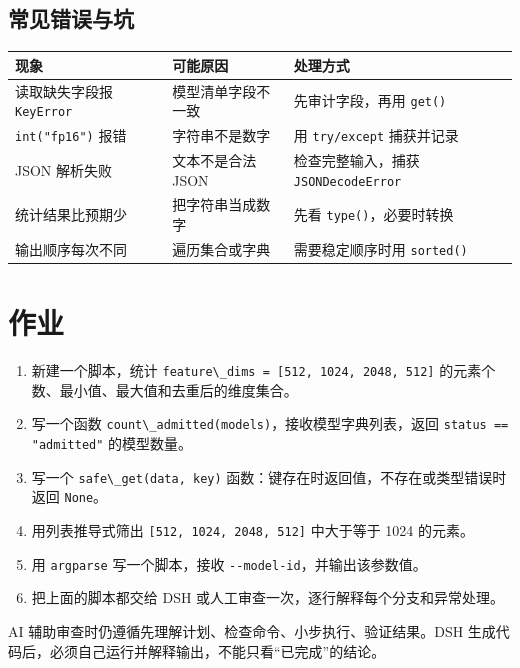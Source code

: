 \subsection{常见错误与坑}\label{src-appendix-appendix3-pitfalls}

\begin{longtable}[]{@{}
  >{\raggedright\arraybackslash}p{}
  >{\raggedright\arraybackslash}p{}
  >{\raggedright\arraybackslash}p{}@{}}
\toprule\noalign{}
\begin{minipage}[b]{\linewidth}\raggedright
现象
\end{minipage} & \begin{minipage}[b]{\linewidth}\raggedright
可能原因
\end{minipage} & \begin{minipage}[b]{\linewidth}\raggedright
处理方式
\end{minipage} \\
\midrule\noalign{}
\endhead
\bottomrule\noalign{}
\endlastfoot
读取缺失字段报 \passthrough{\lstinline!KeyError!} & 模型清单字段不一致 &
先审计字段，再用 \passthrough{\lstinline!get()!} \\
\passthrough{\lstinline!int("fp16")!} 报错 & 字符串不是数字 & 用
\passthrough{\lstinline!try/except!} 捕获并记录 \\
JSON 解析失败 & 文本不是合法 JSON & 检查完整输入，捕获
\passthrough{\lstinline!JSONDecodeError!} \\
统计结果比预期少 & 把字符串当成数字 & 先看
\passthrough{\lstinline!type()!}，必要时转换 \\
输出顺序每次不同 & 遍历集合或字典 & 需要稳定顺序时用
\passthrough{\lstinline!sorted()!} \\
\end{longtable}

\section{作业}\label{src-appendix-appendix3-assignment}

\begin{enumerate}
\def\labelenumi{\arabic{enumi}.}
\tightlist
\item
  新建一个脚本，统计
  \passthrough{\lstinline!feature\_dims = [512, 1024, 2048, 512]!}
  的元素个数、最小值、最大值和去重后的维度集合。
\item
  写一个函数
  \passthrough{\lstinline!count\_admitted(models)!}，接收模型字典列表，返回
  \passthrough{\lstinline!status == "admitted"!} 的模型数量。
\item
  写一个 \passthrough{\lstinline!safe\_get(data, key)!}
  函数：键存在时返回值，不存在或类型错误时返回
  \passthrough{\lstinline!None!}。
\item
  用列表推导式筛出 \passthrough{\lstinline![512, 1024, 2048, 512]!}
  中大于等于 1024 的元素。
\item
  用 \passthrough{\lstinline!argparse!} 写一个脚本，接收
  \passthrough{\lstinline!--model-id!}，并输出该参数值。
\item
  把上面的脚本都交给 DSH 或人工审查一次，逐行解释每个分支和异常处理。
\end{enumerate}

AI 辅助审查时仍遵循先理解计划、检查命令、小步执行、验证结果。DSH
生成代码后，必须自己运行并解释输出，不能只看``已完成''的结论。
